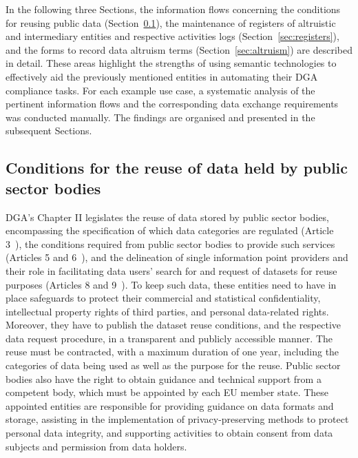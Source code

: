 In the following three Sections, the information flows concerning the conditions for reusing public data (Section~\ref{sec:reuse}), the maintenance of registers of altruistic and intermediary entities and respective activities logs (Section~\ref{sec:registers}), and the forms to record data altruism terms (Section~\ref{sec:altruism}) are described in detail.
These areas highlight the strengths of using semantic technologies to effectively aid the previously mentioned entities in automating their DGA compliance tasks.
For each example use case, a systematic analysis of the pertinent information flows and the corresponding data exchange requirements was conducted manually.
The findings are organised and presented in the subsequent Sections.

\subsection{Conditions for the reuse of data held by public sector bodies}
\label{sec:reuse}

DGA's Chapter II legislates the reuse of data stored by public sector bodies, encompassing the specification of which data categories are regulated (Article 3~\citeyearpar{noauthor_regulation_2022}), the conditions required from public sector bodies to provide such services (Articles 5 and 6~\citeyearpar{noauthor_regulation_2022}), and the delineation of single information point providers and their role in facilitating data users' search for and request of datasets for reuse purposes (Articles 8 and 9~\citeyearpar{noauthor_regulation_2022}).
To keep such data, these entities need to have in place safeguards to protect their commercial and statistical confidentiality, intellectual property rights of third parties, and personal data-related rights.
Moreover, they have to publish the dataset reuse conditions, and the respective data request procedure, in a transparent and publicly accessible manner.
The reuse must be contracted, with a maximum duration of one year, including the categories of data being used as well as the purpose for the reuse. 
Public sector bodies also have the right to obtain guidance and technical support from a competent body, which must be appointed by each EU member state.
These appointed entities are responsible for providing guidance on data formats and storage, assisting in the implementation of privacy-preserving methods to protect personal data integrity, and supporting activities to obtain consent from data subjects and permission from data holders.

